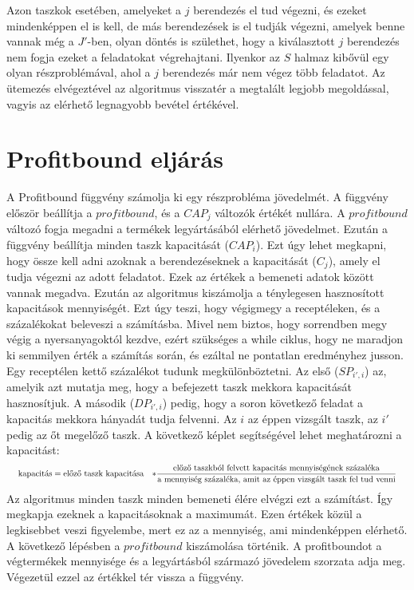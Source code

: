 \newpage
Azon taszkok esetében, amelyeket a $j$ berendezés el tud végezni, és ezeket mindenképpen el is kell, de más berendezések is el tudják végezni, amelyek benne vannak még a $J'$-ben, olyan döntés is születhet, hogy a kiválasztott $j$ berendezés nem fogja ezeket a feladatokat végrehajtani.
Ilyenkor az $S$ halmaz kibővül egy olyan részproblémával, ahol a $j$ berendezés már nem végez több feladatot.
Az ütemezés elvégeztével az algoritmus visszatér a megtalált legjobb megoldással, vagyis az elérhető legnagyobb bevétel értékével.

\section{Profitbound eljárás}
A Profitbound függvény számolja ki egy részprobléma jövedelmét.
A függvény először beállítja a $profitbound$, és a $CAP_{j}$ változók értékét nullára.
A $profitbound$ változó fogja megadni a termékek legyártásából elérhető jövedelmet.
Ezután a függvény beállítja minden taszk kapacitását ($CAP_{i}$).
Ezt úgy lehet megkapni, hogy össze kell adni azoknak a berendezéseknek a kapacitását ($C_{j}$), amely el tudja végezni az adott feladatot.
Ezek az értékek a bemeneti adatok között vannak megadva.
Ezután az algoritmus kiszámolja a ténylegesen hasznosított kapacitások mennyiségét.
Ezt úgy teszi, hogy végigmegy a receptéleken, és a százalékokat beleveszi a számításba.
Mivel nem biztos, hogy sorrendben megy végig a nyersanyagoktól kezdve, ezért szükséges a while ciklus, hogy ne maradjon ki semmilyen érték a számítás során, és ezáltal ne pontatlan eredményhez jusson.
Egy receptélen kettő százalékot tudunk megkülönböztetni.
Az első ($SP_{i',i}$) az, amelyik azt mutatja meg, hogy a befejezett taszk mekkora kapacitását hasznosítjuk.
A második ($DP_{i',i}$) pedig, hogy a soron következő feladat a kapacitás mekkora hányadát tudja felvenni.
Az $i$ az éppen vizsgált taszk, az $i'$ pedig az őt megelőző taszk.
A következő képlet segítségével lehet meghatározni a kapacitást:
\begin{gather}
\scalebox{0.75}{$
\begin{align*}
\text{kapacitás}&= \text{előző taszk kapacitása}&*\frac{\text{előző taszkból felvett kapacitás mennyiségének százaléka}}{\text{a mennyiség százaléka, amit az éppen vizsgált taszk fel tud venni}}
\end{align*}$}	
\end{gather}
Az algoritmus minden taszk minden bemeneti élére elvégzi ezt a számítást.
Így megkapja ezeknek a kapacitásoknak a maximumát.
Ezen értékek közül a legkisebbet veszi figyelembe, mert ez az a mennyiség, ami mindenképpen elérhető.
A következő lépésben a $profitbound$ kiszámolása történik.
A profitboundot a végtermékek mennyisége és a legyártásból származó jövedelem szorzata adja meg.
Végezetül ezzel az értékkel tér vissza a függvény.

